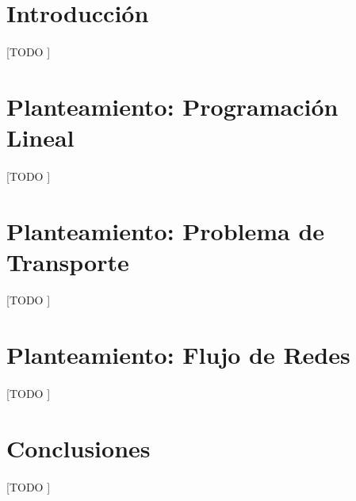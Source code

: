 \documentclass{article}
\begin{document}
  \maketitle


  \section{Introducción}

    \paragraph{}
    [TODO ]

  \section{Planteamiento: Programación Lineal}

    \paragraph{}
    [TODO ]

  \section{Planteamiento: Problema de Transporte}

    \paragraph{}
    [TODO ]

  \section{Planteamiento: Flujo de Redes}

    \paragraph{}
    [TODO ]

  \section{Conclusiones}

    \paragraph{}
    [TODO ]




  \nocite{subject:pent2017}
  \nocite{tool:xpress-mosel}
  \nocite{repository:network-flow-transeuro}
  
  
  
\end{document}
